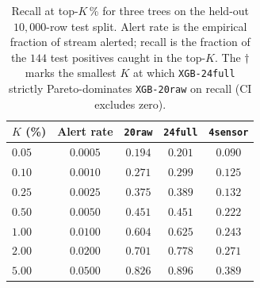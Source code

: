 \begin{table}[t]
\centering
\small
\caption{Recall at top-$K$\,\% for three trees on the held-out
$10{,}000$-row test split. Alert rate is the empirical fraction of stream
alerted; recall is the fraction of the $144$ test positives caught in the
top-$K$. The $\dagger$ marks the smallest $K$ at which \texttt{XGB-24full}
strictly Pareto-dominates \texttt{XGB-20raw} on recall (CI excludes zero).}
\label{tab:p8-alert-volume}
\begin{tabular}{lcccc}
\toprule
$K$ (\%) & Alert rate & \texttt{20raw} & \texttt{24full} & \texttt{4sensor} \\
\midrule
$0.05$  & $0.0005$ & $0.194$ & $0.201$ & $0.090$ \\
$0.10$  & $0.0010$ & $0.271$ & $0.299$ & $0.125$ \\
$0.25$  & $0.0025$ & $0.375$ & $0.389$ & $0.132$ \\
$0.50$  & $0.0050$ & $0.451$ & $0.451$ & $0.222$ \\
$1.00$  & $0.0100$ & $0.604$ & $0.625$ & $0.243$ \\
$2.00$  & $0.0200$ & $0.701$ & $0.778$ & $0.271$ \\
$5.00$  & $0.0500$ & $0.826$ & $0.896$ & $0.389$ \\
\bottomrule
\end{tabular}
\end{table}

